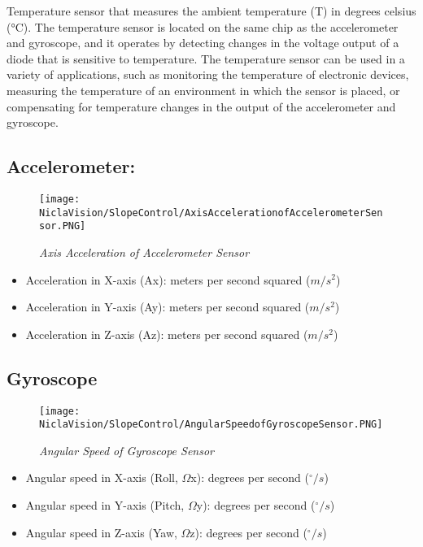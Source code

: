 \bigskip

 Temperature sensor that measures the ambient temperature (T) in degrees celsius (°C). The temperature sensor is located on the same chip as the accelerometer and gyroscope, and it operates by detecting changes in the voltage output of a diode that is sensitive to temperature. The temperature sensor can be used in a variety of applications, such as monitoring the temperature of electronic devices, measuring the temperature of an environment in which the sensor is placed, or compensating for temperature changes in the output of the accelerometer and gyroscope.

\bigskip

\subsection{Accelerometer:}\cite{Chiang:2006}

\begin{figure}[h]
	\centering
	\texttt{[image: NiclaVision/SlopeControl/AxisAccelerationofAccelerometerSensor.PNG]}
	\caption{\emph{Axis Acceleration of Accelerometer Sensor}}
	\label{fig: Axis Acceleration of Accelerometer Sensor}
\end{figure}

\begin{itemize}
    \item Acceleration in X-axis (Ax): meters per second squared ($m/s^2$)
    \item Acceleration in Y-axis (Ay): meters per second squared ($m/s^2$)
    \item Acceleration in Z-axis (Az): meters per second squared ($m/s^2$)
\end{itemize}


\subsection{Gyroscope}

\begin{figure}[h]
	\centering
	\texttt{[image: NiclaVision/SlopeControl/AngularSpeedofGyroscopeSensor.PNG]}
	\caption{\emph{Angular Speed of Gyroscope Sensor}}
	\label{fig: Angular Speed of Gyroscope Sensor.PNG}
\end{figure}

\begin{itemize}
    \item Angular speed in X-axis (Roll, $\Omega$x): degrees per second ($^\circ/s$)
    \item Angular speed in Y-axis (Pitch, $\Omega$y): degrees per second ($^\circ/s$)
    \item Angular speed in Z-axis (Yaw, $\Omega$z): degrees per second ($^\circ/s$)
\end{itemize}

